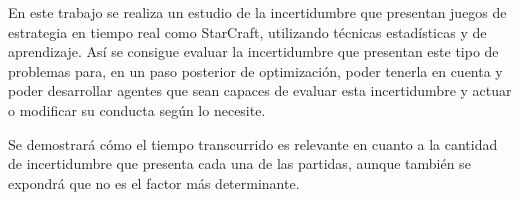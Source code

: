 En este trabajo se realiza un estudio de la incertidumbre que presentan juegos
de estrategia en tiempo real como StarCraft, utilizando técnicas estadísticas
y de aprendizaje. Así se consigue evaluar la incertidumbre
que presentan este tipo de problemas para, en un paso posterior de optimización,
poder tenerla en cuenta y poder desarrollar agentes que sean capaces de evaluar
esta incertidumbre y actuar o modificar su conducta según lo necesite.

Se demostrará cómo el tiempo transcurrido es relevante en cuanto a la cantidad
de incertidumbre que presenta cada una de las partidas, aunque también se
expondrá que no es el factor más determinante.
